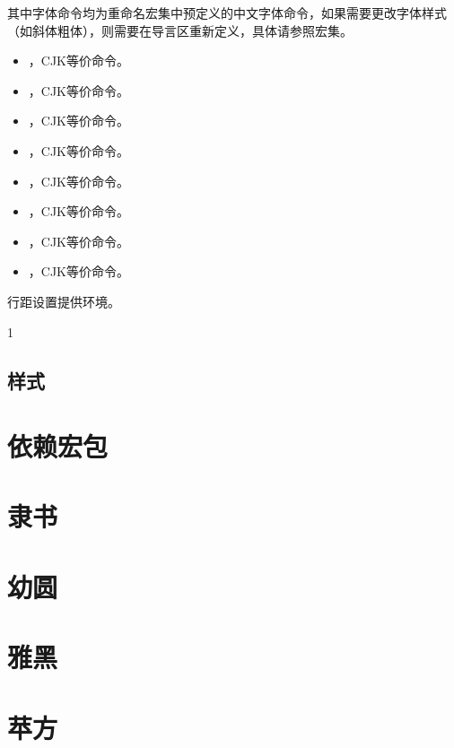 \documentclass[AutoFakeBold,AutoFakeSlant]{ctexart}
\begin{document}
其中字体命令均为重命名\CTeX 宏集中预定义的中文字体命令，如果需要更改字体样式（如斜体粗体），则需要在导言区重新定义，具体请参照\CTeX 宏集。

\begin{itemize}
	\item {}，CJK等价命令。
	\item {}，CJK等价命令。
	\item {}，CJK等价命令。
	\item {}，CJK等价命令。
	\item {}，CJK等价命令。
	\item {}，CJK等价命令。
	\item {}，CJK等价命令。
	\item {}，CJK等价命令。
\end{itemize}

行距设置提供环境。

\begin{行距}{1}
\zhlipsum[1]
\end{行距}

\zhlipsum[2]



\subsection{样式}





\section{依赖宏包}











\section{隶书}

\section{幼圆}

\section{雅黑}
    \zhlipsum[7]

\section{苹方}
\end{document}
